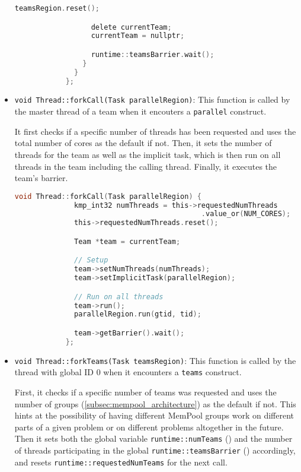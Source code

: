\begin{itemize}
\begin{lstlisting}[language=C, caption={Thread::run}, label={lst:thread-run},
          escapechar=@]
                  teamsRegion.reset();

                  delete currentTeam;
                  currentTeam = nullptr;

                  runtime::teamsBarrier.wait();
                }
              }
            };
          \end{lstlisting}

	\item \texttt{void Thread::forkCall(Task parallelRegion)}: This function is called by the master
	      thread of a team when it encouters a \texttt{parallel} construct.

	      It first checks if a specific number of threads has been requested and uses the total
	      number of cores as the default if not. Then, it sets the number of threads for the team as
	      well as the implicit task, which is then run on all threads in the team including the
	      calling thread. Finally, it executes the team's barrier.

	      \begin{lstlisting}[language=C, caption={Thread::forkCall},
          label={lst:thread-forkCall},
          escapechar=@]
            void Thread::forkCall(Task parallelRegion) {
              kmp_int32 numThreads = this->requestedNumThreads
                                            .value_or(NUM_CORES);
              this->requestedNumThreads.reset();

              Team *team = currentTeam;

              // Setup
              team->setNumThreads(numThreads);
              team->setImplicitTask(parallelRegion);

              // Run on all threads
              team->run();
              parallelRegion.run(gtid, tid);

              team->getBarrier().wait();
            };
    \end{lstlisting}

	\item \texttt{void Thread::forkTeams(Task teamsRegion)}: This function is called by the thread
	      with global ID 0 when it encounters a \texttt{teams} construct.

	      First, it checks if a specific number of teams was requested and uses the number of groups
	      (\cref{subsec:mempool_architecture}) as the default if not. This hints at the possibility
	      of having different MemPool groups work on different parts of a given problem or on
	      different problems altogether in the future. Then it sets both the global variable
	      \texttt{runtime::numTeams} () and the number of threads participating in the
	      global \texttt{runtime::teamsBarrier} () accordingly, and resets
	      \texttt{runtime::requestedNumTeams} for the next call.


\end{itemize}
